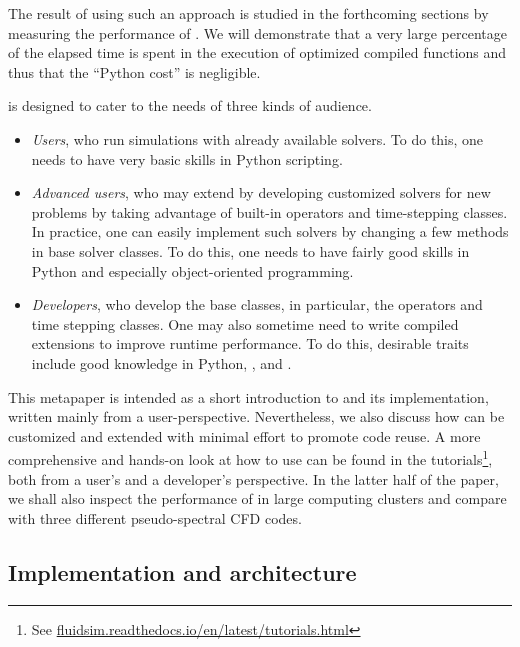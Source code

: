 The result of using such an approach is studied in the forthcoming sections by
measuring the performance of .
%
We will demonstrate that a very large percentage of the elapsed time is spent in
the execution of optimized compiled functions and thus that the ``Python cost'' is
negligible.


 is designed to cater to the needs of three kinds of audience.
\begin{itemize}
\item \emph{Users}, who run simulations with already available solvers. To do
this, one needs to have very basic skills in Python scripting.
\item \emph{Advanced users}, who may extend  by developing
customized solvers for new problems by taking advantage of built-in operators and
time-stepping classes.  In practice, one can easily implement such solvers by
changing a few methods in base solver classes.  To do this, one needs to have
fairly good skills in Python and especially object-oriented programming.
\item \emph{Developers}, who develop the base classes, in particular, the
operators and time stepping classes.  One may also sometime need to write compiled
extensions to improve runtime performance. To do this, desirable traits include
good knowledge in Python, \Numpy,  and .
\end{itemize}

This metapaper is intended as a short introduction to  and its
implementation, written mainly from a user-perspective. Nevertheless, we also discuss how
 can be customized and extended with minimal effort to promote code
reuse.
%
A more comprehensive and hands-on look at how to use  can be found
in the tutorials\footnote{See
\href{https://fluidsim.readthedocs.io/en/latest/tutorials.html}{fluidsim.readthedocs.io/en/latest/tutorials.html}},
both from a user's and a developer's perspective.
%
In the latter half of the paper, we shall also inspect the performance of
 in large computing clusters and compare  with three
different pseudo-spectral CFD codes.

\subsection{Implementation and architecture}


